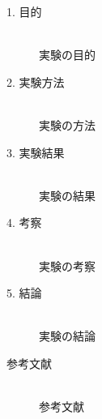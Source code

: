 \documentclass[a4paper, 11pt]{ltjsarticle}
\begin{document}
\begin{description}
    \item[1. 目的]\mbox{}\\
            実験の目的
    \item[2. 実験方法]\mbox{}\\
            実験の方法
    \item[3. 実験結果]\mbox{}\\
            実験の結果
    \item[4. 考察]\mbox{}\\
            実験の考察
    \item[5. 結論]\mbox{}\\
            実験の結論
    \item[参考文献]\mbox{}\\
            参考文献
\end{description}
\end{document}
